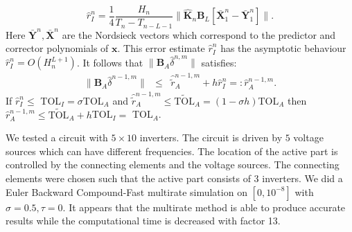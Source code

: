 \documentclass{report}
\begin{document}
\begin{equation}
\hat{r}_I^{n} = \frac{1}{4}\frac{H_n}{T_n - T_{n-L-1}}
\|\hat{\mathbf{K}}_{n}\mathbf{B}_L\left[\bar{\mathbf{X}}_{1}^n-\bar{\mathbf{Y}}_{1}^n\right]
\|.
\end{equation}
Here $\bar{\mathbf{Y}}^n,\bar{\mathbf{X}}^n$ are the Nordsieck vectors
which correspond to the predictor and corrector polynomials of $\mathbf{x}$.
This error estimate $\hat{r}_I^n$ has the asymptotic behaviour
$\hat{r}_I^{n} = O(H_n^{L+1})$.
It follows that
$\|\mathbf{B}_A\hat{\delta}^{n,m}\|$ satisfies:
\begin{equation}\begin{array}{rcl}
\|\mathbf{B}_A\hat{\delta}^{n-1,m}\| &\leq& \hat{\tilde{r}}_A^{n-1,m} +
h\hat{r}_I^{n} =: \hat{r}_A^{n-1,m}.
\end{array}\end{equation}
If $\hat{r}_I^{n} \leq $ TOL$_I = \sigma$TOL$_A$ and
$\hat{\tilde{r}}_A^{n-1,m} \leq \tilde{\mbox{TOL}}_A = (1-\sigma h)$TOL$_A$
then $\hat{r}_A^{n-1,m} \leq \tilde{\mbox{TOL}}_A + h$TOL$_I =$ TOL$_A$.

We tested a circuit with $5 \times 10$ inverters. The circuit is driven
by $5$ voltage sources which can have
different frequencies. The location of the active part is controlled by the connecting
elements and the voltage sources. The connecting elements were chosen such that
the active part consists of 3 inverters.
We did a Euler Backward Compound-Fast multirate simulation on
$[0,10^{-8}]$ with $\sigma = 0.5,\tau = 0$.
It appears that the multirate method is able to produce accurate results
while the computational time
is decreased with factor 13.
\end{document}
